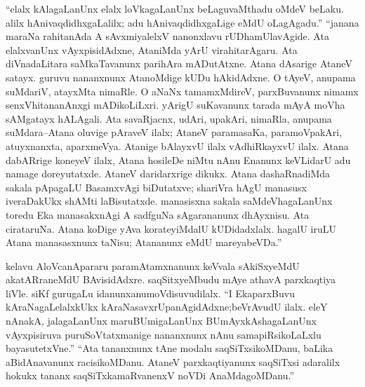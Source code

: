 ``elalx kAlagaLanUnx elalx loVkagaLanUnx beLaguvaMthadu oMdeV beLaku. alilx hAnivaqdidhxgaLalilx; adu hAnivaqdidhxgaLige eMdU oLagAgadu.'' ``janana maraNa rahitanAda A sAvxmiyalelxV nanonxlavu rUDhamUlavAgide. Ata elalxvanUnx vAyxpisidAdxne, AtaniMda yArU virahitarAgaru. Ata diVnadaLitara saMkaTavanunx parihAra mADutAtxne. Atana dAsarige AtaneV satayx. guruvu nananxnunx AtanoMdige kUDu hAkidAdxne. O tAyeV, anupama suMdariV, atayxMta nimaRle. O aNaNx tamamxMdireV, parxBuvanunx nimamx senxVhitananAnxgi mADikoLiLxri. yArigU suKavanunx tarada mAyA moVha sAMgatayx hALAgali. Ata savaRjacnx, udAri, upakAri, nimaRla, anupama suMdara--Atana oluvige pAraveV ilalx; AtaneV paramasaKa, paramoVpakAri, atuyxnanxta, aparxmeVya. Atanige bAlayxvU ilalx vAdhiRkayxvU ilalx. Atana dabARrige koneyeV ilalx, Atana hosileDe niMtu nAnu Enanunx keVLidarU adu namage doreyutatxde. AtaneV daridarxrige dikukx. Atana dashaRnadiMda sakala pApagaLU BasamxvAgi biDutatxve; shariVra hAgU manasusx iveraDakUkx shAMti laBisutatxde. manasisxna sakala saMdeVhagaLanUnx toredu Eka manasakxnAgi A sadfguNa sAgarananunx dhAyxnisu. Ata cirataruNa. Atana koDige yAva korateyiMdalU kUDidadxlalx. hagalU iruLU Atana manasasxnunx taNisu; Atananunx eMdU mareyabeVDa.''

kelavu AloVcanApararu paramAtamxnanunx keVvala sAkiSxyeMdU akatARraneMdU BAvisidAdxre. saqSitxyeMbudu mAye athavA parxkaqtiya liVle. siKf gurugaLu \hbox{idanunx}\break anumoVdisuvudilalx. ``I EkaparxBuvu kAraNagaLelalxkUkx kAraNasavxrUpanAgidAdxne;\break beVrAvudU ilalx. eleY nAnakA, jalagaLanUnx maruBUmigaLanUnx BUmAyxkAsha\-gaLanUnx vAyxpisiruva puruSoVtatxmanige nananxnunx nAnu samapiRsikoLaLxlu bayasutetxVne.'' ``Ata tananxnunx tAne modalu saqSiTxsikoMDanu, baLika aBidAnavanunx racisikoMDanu. AtaneV parxkaqtiyanunx saqSiTxsi adaralilx hokukx tananx saqSiTxkamaRvanenxV noVDi AnaMdagoMDanu.''

